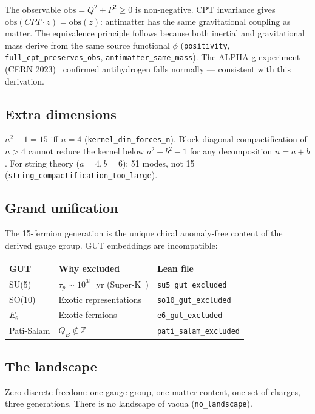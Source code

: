 \documentclass[11pt,letterpaper]{article}
\theoremstyle{remark}
\newcommand{\lean}[1]{\texttt{\small #1}}
\begin{document}
The observable $\mathrm{obs} = Q^2 + P^2 \geq 0$ is non-negative.
CPT invariance gives $\mathrm{obs}(CPT \cdot z) = \mathrm{obs}(z)$:
antimatter has the same gravitational coupling as matter. The
equivalence principle follows because both inertial and gravitational
mass derive from the same source functional $\phi$
(\lean{positivity}, \lean{full\_cpt\_preserves\_obs},
\lean{antimatter\_same\_mass}). The ALPHA-g experiment (CERN
2023)~\cite{ALPHA} confirmed antihydrogen falls normally — consistent
with this derivation.

\subsection{Extra dimensions}

$n^2 - 1 = 15$ iff $n = 4$ (\lean{kernel\_dim\_forces\_n}). Block-diagonal
compactification of $n > 4$ cannot reduce the kernel below $a^2 + b^2 - 1$
for any decomposition $n = a + b$. For string theory
($a = 4, b = 6$): 51 modes, not 15 (\lean{string\_compactification\_too\_large}).

\subsection{Grand unification}

The 15-fermion generation is the unique chiral anomaly-free content of
the derived gauge group. GUT embeddings are incompatible:

\begin{center}
\begin{tabular}{@{}lll@{}}
\toprule
GUT & Why excluded & Lean file \\
\midrule
SU(5) & $\tau_p \sim 10^{31}$~yr (Super-K~\cite{SuperK}) &
  \lean{su5\_gut\_excluded} \\
SO(10) & Exotic representations & \lean{so10\_gut\_excluded} \\
$E_6$ & Exotic fermions & \lean{e6\_gut\_excluded} \\
Pati-Salam & $Q_B \notin \mathbb{Z}$ & \lean{pati\_salam\_excluded} \\
\bottomrule
\end{tabular}
\end{center}

\subsection{The landscape}

Zero discrete freedom: one gauge group, one matter content, one set
of charges, three generations. There is no landscape of vacua
(\lean{no\_landscape}).
\end{document}
